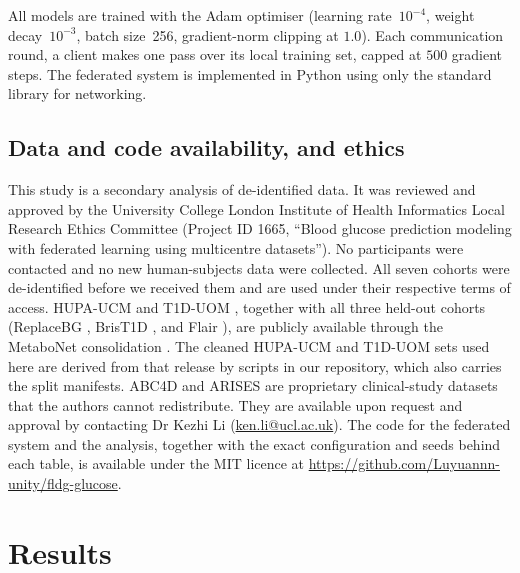 \documentclass[10pt,letterpaper]{article}
\begin{document}
All models are trained with the Adam optimiser (learning rate~$10^{-4}$, weight
decay~$10^{-3}$, batch size~256, gradient-norm clipping at $1.0$). Each
communication round, a client makes one pass over its local training set,
capped at $500$ gradient steps. The
federated system is implemented in Python using only the standard library for
networking.

\subsection*{Data and code availability, and ethics}

This study is a secondary analysis of de-identified data. It was reviewed and
approved by the University College London Institute of Health Informatics Local
Research Ethics Committee (Project ID 1665, ``Blood glucose prediction modeling
with federated learning using multicentre datasets''). No participants were
contacted and no new human-subjects data were collected. All seven cohorts were
de-identified before we received them and are used under their respective terms
of access. HUPA-UCM \cite{hidalgo2024hupaucm} and T1D-UOM
\cite{alsuhaymi2025t1duom}, together with all three held-out cohorts
(ReplaceBG \cite{aleppo2017replacebg}, BrisT1D \cite{james2025brist1d}, and Flair
\cite{jaeb_flair}), are publicly available through the MetaboNet consolidation
\cite{wolff2026metabonet}. The cleaned HUPA-UCM and T1D-UOM sets used here are
derived from that release by scripts in our repository, which also carries the
split manifests. ABC4D \cite{abc4d_nct} and ARISES
\cite{zhu2022arises} are proprietary clinical-study datasets that the authors
cannot redistribute. They are available upon request and approval by contacting
Dr Kezhi Li (\href{mailto:ken.li@ucl.ac.uk}{ken.li@ucl.ac.uk}). The code for the
federated system and the analysis, together with the exact configuration and
seeds behind each table, is available under the MIT licence at
\url{https://github.com/Luyuannn-unity/fldg-glucose}.

\section*{Results}
\end{document}
